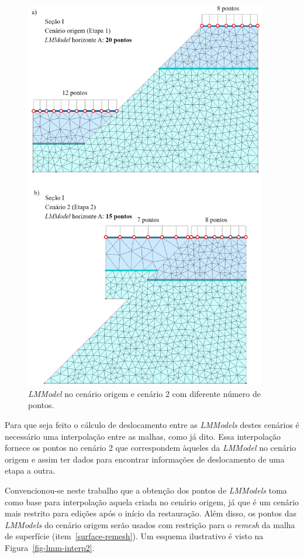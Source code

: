 \begin{figure} [H]
  \begin{center}
    \includegraphics[width=300pt]{images/fig-lmm-interp1}
    \caption{\textit{LMModel} no cenário origem e cenário 2 com diferente número de pontos.}\label{fig-lmm-interp1}
  \end{center}
\end{figure}

Para que seja feito o cálculo de deslocamento entre as \textit{LMModels} destes cenários é necessário uma interpolação entre as malhas, como já dito. Essa interpolação fornece os pontos no cenário 2 que correspondem àqueles da \textit{LMModel} no cenário origem e assim ter dados para encontrar informações de deslocamento de uma etapa a outra.

Convencionou-se neste trabalho que a obtenção dos pontos de \textit{LMModels} toma como base para interpolação aquela criada no cenário origem, já que é um cenário mais restrito para edições após o início da restauração. Além disso, os pontos das \emph{LMModels} do cenário origem serão usados com restrição para o \emph{remesh} da malha de superfície (item~\ref{surface-remesh}). Um esquema ilustrativo é visto na Figura~\ref{fig-lmm-interp2}.

